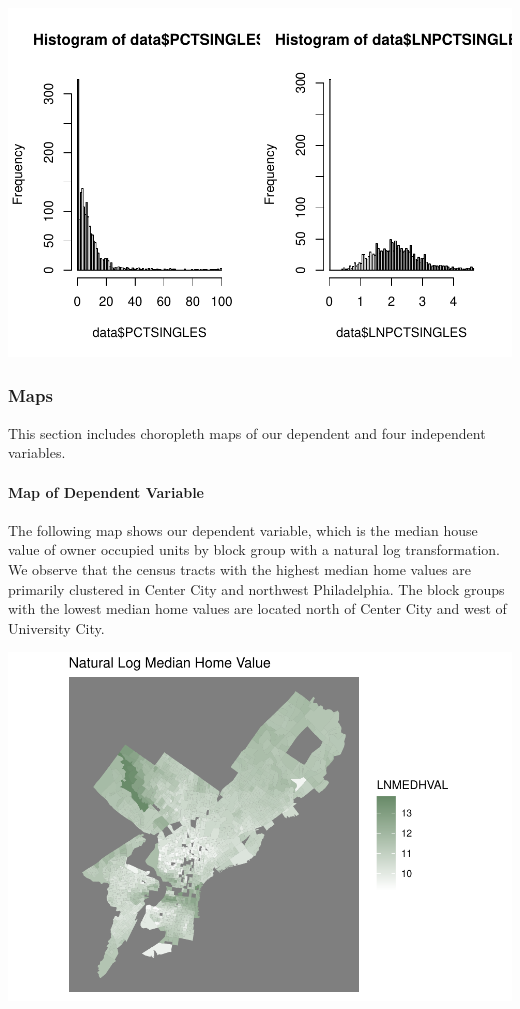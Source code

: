 \documentclass[
]{article}
\begin{document}
\includegraphics{HW1-Regression_files/figure-latex/hist_PCTSINGLES-1.pdf}

\hypertarget{maps}{%
\subsubsection{Maps}\label{maps}}

This section includes choropleth maps of our dependent and four
independent variables.

\hypertarget{map-of-dependent-variable}{%
\paragraph{Map of Dependent Variable}\label{map-of-dependent-variable}}

The following map shows our dependent variable, which is the median
house value of owner occupied units by block group with a natural log
transformation. We observe that the census tracts with the highest
median home values are primarily clustered in Center City and northwest
Philadelphia. The block groups with the lowest median home values are
located north of Center City and west of University City.

\includegraphics{HW1-Regression_files/figure-latex/LNMEDHVAL_map-1.pdf}
\end{document}
